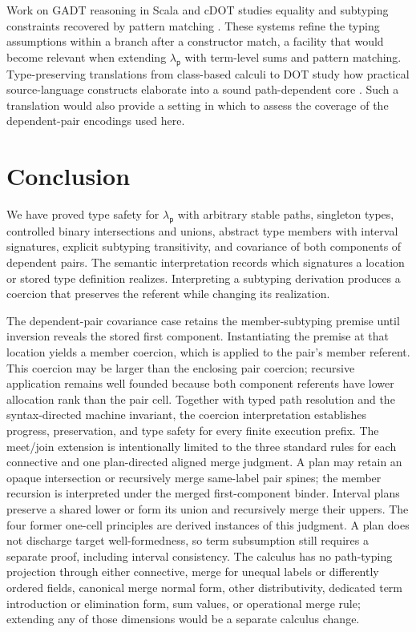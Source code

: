 \documentclass[acmsmall,screen,nonacm]{acmart}
\newcommand{\lambdap}{\ensuremath{\lambda_{\mathsf p}}}
\begin{document}
Work on GADT reasoning in Scala and cDOT studies equality and subtyping
constraints recovered by pattern matching
\citep{parreaux2019gadt,boruchgruszecki2022cdot}. These systems refine the
typing assumptions within a branch after a constructor match, a facility that
would become relevant when extending \lambdap{} with term-level sums and pattern
matching. Type-preserving translations from class-based calculi to DOT study
how practical source-language constructs elaborate into a sound
path-dependent core \citep{martres2023compilation}. Such a translation would
also provide a setting in which to assess the coverage of the dependent-pair
encodings used here.

\section{Conclusion}

We have proved type safety for \lambdap{} with arbitrary stable paths,
singleton types, controlled binary intersections and unions, abstract type
members with interval signatures, explicit subtyping transitivity, and
covariance of both components of dependent pairs.
The semantic interpretation records which signatures a location or stored
type definition realizes. Interpreting a subtyping derivation produces a
coercion that preserves the referent while changing its realization.

The dependent-pair covariance case retains the member-subtyping premise until inversion
reveals the stored first component. Instantiating the premise at that location
yields a member coercion, which is applied to the pair's member referent. This
coercion may be larger than the enclosing pair coercion; recursive application
remains well founded because both component referents have lower allocation
rank than the pair cell. Together with typed path resolution and the
syntax-directed machine invariant, the coercion interpretation establishes
progress, preservation, and type safety for every finite execution prefix.
The meet/join extension is intentionally limited to the three standard rules
for each connective and one plan-directed aligned merge judgment. A plan may
retain an opaque intersection or recursively merge same-label pair spines;
the member recursion is interpreted under the merged first-component binder.
Interval plans preserve a shared lower or form its union and recursively merge
their uppers. The four former one-cell principles are derived instances of
this judgment. A plan does not discharge target well-formedness, so term
subsumption still requires a separate proof, including interval consistency.
The calculus has no path-typing projection through either connective, merge
for unequal labels or differently ordered fields, canonical merge normal
form, other distributivity, dedicated term introduction or elimination form,
sum values, or operational merge rule; extending any of those dimensions
would be a separate calculus change.



\end{document}

